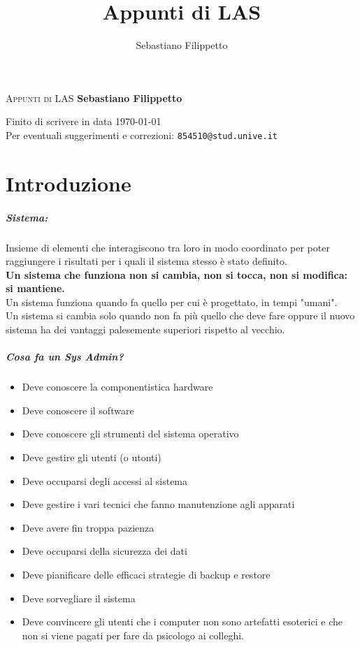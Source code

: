 \documentclass[a4paper]{report}
\title{\Huge{Appunti di LAS}}
\author{Sebastiano Filippetto}
\begin{document}
\begin{minipage}[c][\textheight][c]{\textwidth}\centering
\textsc{\Huge Appunti di LAS}
\vfill
\textbf{\Large Sebastiano Filippetto}
\vfill
\end{minipage}
\newpage
\begin{minipage}[c][\textheight][c]{\textwidth}
\centering
Finito di scrivere in data \today \\
Per eventuali suggerimenti e correzioni: \texttt{854510@stud.unive.it}
\end{minipage}

\tableofcontents
\newpage
\chapter{Introduzione}
\paragraph{Sistema:} Insieme di elementi che interagiscono tra loro in modo coordinato per poter raggiungere i risultati per i quali il sistema stesso è stato definito. \\
\textbf{Un sistema che funziona non si cambia, non si tocca, non si modifica: si mantiene.}\\
Un sistema funziona quando fa quello per cui è progettato, in tempi "umani".\\
Un sistema si cambia solo quando non fa più quello che deve fare oppure il nuovo sistema ha dei vantaggi palesemente superiori rispetto al vecchio.\\
\paragraph{Cosa fa un Sys Admin?}
\begin{itemize}
\item Deve conoscere la componentistica hardware
\item Deve conoscere il software
\item Deve conoscere gli strumenti del sistema operativo
\item Deve gestire gli utenti (o utonti)
\item Deve occuparsi degli accessi al sistema
\item Deve gestire i vari tecnici che fanno manutenzione agli apparati
\item Deve avere fin troppa pazienza
\item Deve occuparsi della sicurezza dei dati
\item Deve pianificare delle efficaci strategie di backup e restore
\item Deve sorvegliare il sistema
\item Deve convincere gli utenti che i computer non sono artefatti esoterici e che non si viene pagati per fare da psicologo ai colleghi.
\end{itemize}
\end{document}
